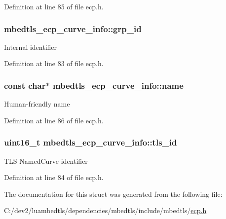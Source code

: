 Definition at line 85 of file ecp.\-h.

\hypertarget{structmbedtls__ecp__curve__info_a1fdb81fb58ed6039b5c9fe1a3c82852b}{
\subsubsection[{grp\-\_\-id}]{ mbedtls\-\_\-ecp\-\_\-curve\-\_\-info\-::grp\-\_\-id}}\label{structmbedtls__ecp__curve__info_a1fdb81fb58ed6039b5c9fe1a3c82852b}
Internal identifier 

Definition at line 83 of file ecp.\-h.

\hypertarget{structmbedtls__ecp__curve__info_a123ba197ecf3a5573e28030393f7b1dd}{
\subsubsection[{name}]{\setlength{\rightskip}{0pt plus 5cm}const char$\ast$ mbedtls\-\_\-ecp\-\_\-curve\-\_\-info\-::name}}\label{structmbedtls__ecp__curve__info_a123ba197ecf3a5573e28030393f7b1dd}
Human-\/friendly name 

Definition at line 86 of file ecp.\-h.

\hypertarget{structmbedtls__ecp__curve__info_ac2754d3ed70b7cc54ba3567372763551}{
\subsubsection[{tls\-\_\-id}]{\setlength{\rightskip}{0pt plus 5cm}uint16\-\_\-t mbedtls\-\_\-ecp\-\_\-curve\-\_\-info\-::tls\-\_\-id}}\label{structmbedtls__ecp__curve__info_ac2754d3ed70b7cc54ba3567372763551}
T\-L\-S Named\-Curve identifier 

Definition at line 84 of file ecp.\-h.



The documentation for this struct was generated from the following file\-:\begin{DoxyCompactItemize}
\item 
C\-:/dev2/luambedtls/dependencies/mbedtls/include/mbedtls/\hyperlink{ecp_8h}{ecp.\-h}\end{DoxyCompactItemize}
